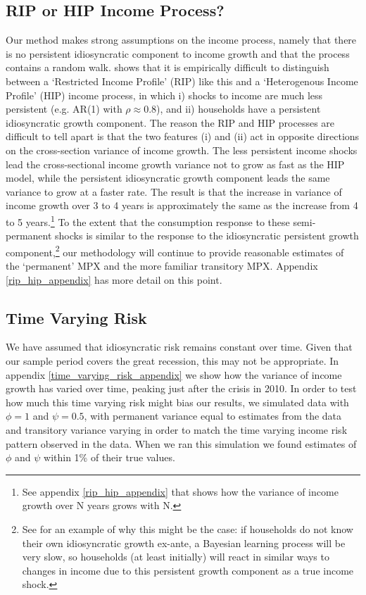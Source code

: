 \documentclass[titlepage]{\econtex}\newcommand{\texname}{ConsumptionHeterogeneity}
\begin{document}
\subsection{RIP or HIP Income Process?} \label{rip_hip}
Our method makes strong assumptions on the income process, namely that there is no persistent idiosyncratic component to income growth and that the process contains a random walk. \cite{guvenen_empirical_2009} shows that it is empirically difficult to distinguish between a `Restricted Income Profile' (RIP) like this and a `Heterogenous Income Profile' (HIP) income process, in which i) shocks to income are much less persistent (e.g. AR(1) with $\rho\approx 0.8$), and ii) households have a persistent idiosyncratic growth component. The reason the RIP and HIP processes are difficult to tell apart is that the two features (i) and (ii) act in opposite directions on the cross-section variance of income growth. The less persistent income shocks lead the cross-sectional income growth variance not to grow as fast as the HIP model, while the persistent idiosyncratic growth component leads the same variance to grow at a faster rate. The result is that the increase in variance of income growth over 3 to 4 years is approximately the same as the increase from 4 to 5 years.\footnote{See appendix \ref{rip_hip_appendix} that shows how the variance of income growth over N years grows with N.} To the extent that the consumption response to these semi-permanent shocks is similar to the response to the idiosyncratic persistent growth component,\footnote{See \cite{guvenen_learning_2007} for an example of why this might be the case: if households do not know their own idiosyncratic growth ex-ante, a Bayesian learning process will be very slow, so households (at least initially) will react in similar ways to changes in income due to this persistent growth component as a true income shock.} our methodology will continue to provide reasonable estimates of the `permanent' MPX and the more familiar transitory MPX. Appendix \ref{rip_hip_appendix} has more detail on this point.

\subsection{Time Varying Risk} \label{time_varying_risk}
We have assumed that idiosyncratic risk remains constant over time. Given that our sample period covers the great recession, this may not be appropriate. In appendix \ref{time_varying_risk_appendix} we show how the variance of income growth has varied over time, peaking just after the crisis in 2010. In order to test how much this time varying risk might bias our results, we simulated data with $\phi=1$ and $\psi=0.5$, with permanent variance equal to estimates from the data and transitory variance varying in order to match the time varying income risk pattern observed in the data. When we ran this simulation we found estimates of $\phi$ and $\psi$ within 1\% of their true values.
\end{document}

